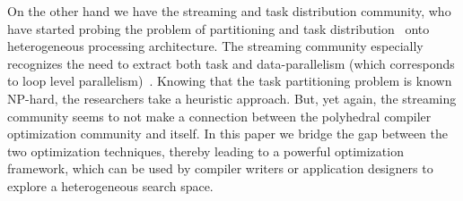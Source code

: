 \documentclass[10pt, conference, compsocconf]{IEEEtran}
\begin{document}
On the other hand we have the streaming and task distribution community,
who have started probing the problem of partitioning and task
distribution~\cite{ssan05,adou04,pcar09} onto heterogeneous processing
architecture. The streaming community especially recognizes the need to
extract both task and data-parallelism (which corresponds to loop level
parallelism)~\cite{mgor06}. Knowing that the task partitioning problem
is known NP-hard, the researchers take a heuristic approach.  But, yet
again, the streaming community seems to not make a connection between
the polyhedral compiler optimization community and itself. In this paper
we bridge the gap between the two optimization techniques, thereby
leading to a powerful optimization framework, which can be used by
compiler writers or application designers to explore a heterogeneous
search space.



\end{document}
